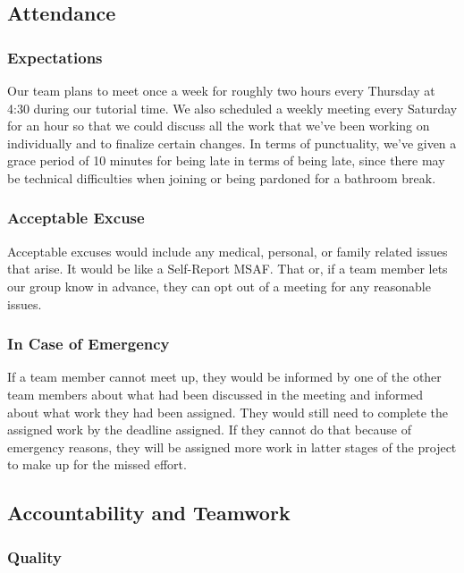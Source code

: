 \documentclass{article}
\begin{document}
\subsection*{Attendance}

\subsubsection*{Expectations}

Our team plans to meet once a week for roughly two hours every Thursday at 4:30 during our tutorial time. We also scheduled a weekly meeting every Saturday for an hour so that we could discuss all the work that we’ve been working on individually and to finalize certain changes. In terms of punctuality, we’ve given a grace period of 10 minutes for being late in terms of being late, since there may be technical difficulties when joining or being pardoned for a bathroom break. 

\subsubsection*{Acceptable Excuse}

Acceptable excuses would include any medical, personal, or family related issues that arise. It would be like a Self-Report MSAF. That or, if a team member lets our group know in advance, they can opt out of a meeting for any reasonable issues.

\subsubsection*{In Case of Emergency}

If a team member cannot meet up, they would be informed by one of the other team members about what had been discussed in the meeting and informed about what work they had been assigned. They would still need to complete the assigned work by the deadline assigned. If they cannot do that because of emergency reasons, they will be assigned more work in latter stages of the project to make up for the missed effort. 

\subsection*{Accountability and Teamwork}

\subsubsection*{Quality} 
\end{document}
